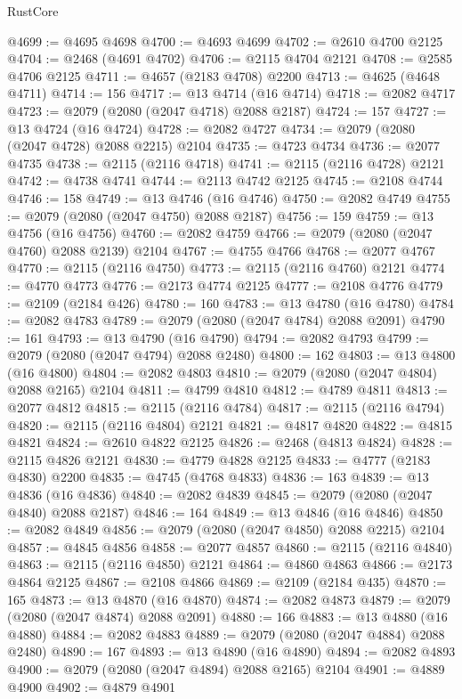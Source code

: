\begin{lexlean}{RustCore}
\begin{coremodule}
@4699 := @4695 @4698
@4700 := @4693 @4699
@4702 := @2610 @4700 @2125
@4704 := @2468 (@4691 @4702)
@4706 := @2115 @4704 @2121
@4708 := @2585 @4706 @2125
@4711 := @4657 (@2183 @4708) @2200
@4713 := @4625 (@4648 @4711)
@4714 := 156
@4717 := @13 @4714 (@16 @4714)
@4718 := @2082 @4717
@4723 := @2079 (@2080 (@2047 @4718) @2088 @2187)
@4724 := 157
@4727 := @13 @4724 (@16 @4724)
@4728 := @2082 @4727
@4734 := @2079 (@2080 (@2047 @4728) @2088 @2215) @2104
@4735 := @4723 @4734
@4736 := @2077 @4735
@4738 := @2115 (@2116 @4718)
@4741 := @2115 (@2116 @4728) @2121
@4742 := @4738 @4741
@4744 := @2113 @4742 @2125
@4745 := @2108 @4744
@4746 := 158
@4749 := @13 @4746 (@16 @4746)
@4750 := @2082 @4749
@4755 := @2079 (@2080 (@2047 @4750) @2088 @2187)
@4756 := 159
@4759 := @13 @4756 (@16 @4756)
@4760 := @2082 @4759
@4766 := @2079 (@2080 (@2047 @4760) @2088 @2139) @2104
@4767 := @4755 @4766
@4768 := @2077 @4767
@4770 := @2115 (@2116 @4750)
@4773 := @2115 (@2116 @4760) @2121
@4774 := @4770 @4773
@4776 := @2173 @4774 @2125
@4777 := @2108 @4776
@4779 := @2109 (@2184 @426)
@4780 := 160
@4783 := @13 @4780 (@16 @4780)
@4784 := @2082 @4783
@4789 := @2079 (@2080 (@2047 @4784) @2088 @2091)
@4790 := 161
@4793 := @13 @4790 (@16 @4790)
@4794 := @2082 @4793
@4799 := @2079 (@2080 (@2047 @4794) @2088 @2480)
@4800 := 162
@4803 := @13 @4800 (@16 @4800)
@4804 := @2082 @4803
@4810 := @2079 (@2080 (@2047 @4804) @2088 @2165) @2104
@4811 := @4799 @4810
@4812 := @4789 @4811
@4813 := @2077 @4812
@4815 := @2115 (@2116 @4784)
@4817 := @2115 (@2116 @4794)
@4820 := @2115 (@2116 @4804) @2121
@4821 := @4817 @4820
@4822 := @4815 @4821
@4824 := @2610 @4822 @2125
@4826 := @2468 (@4813 @4824)
@4828 := @2115 @4826 @2121
@4830 := @4779 @4828 @2125
@4833 := @4777 (@2183 @4830) @2200
@4835 := @4745 (@4768 @4833)
@4836 := 163
@4839 := @13 @4836 (@16 @4836)
@4840 := @2082 @4839
@4845 := @2079 (@2080 (@2047 @4840) @2088 @2187)
@4846 := 164
@4849 := @13 @4846 (@16 @4846)
@4850 := @2082 @4849
@4856 := @2079 (@2080 (@2047 @4850) @2088 @2215) @2104
@4857 := @4845 @4856
@4858 := @2077 @4857
@4860 := @2115 (@2116 @4840)
@4863 := @2115 (@2116 @4850) @2121
@4864 := @4860 @4863
@4866 := @2173 @4864 @2125
@4867 := @2108 @4866
@4869 := @2109 (@2184 @435)
@4870 := 165
@4873 := @13 @4870 (@16 @4870)
@4874 := @2082 @4873
@4879 := @2079 (@2080 (@2047 @4874) @2088 @2091)
@4880 := 166
@4883 := @13 @4880 (@16 @4880)
@4884 := @2082 @4883
@4889 := @2079 (@2080 (@2047 @4884) @2088 @2480)
@4890 := 167
@4893 := @13 @4890 (@16 @4890)
@4894 := @2082 @4893
@4900 := @2079 (@2080 (@2047 @4894) @2088 @2165) @2104
@4901 := @4889 @4900
@4902 := @4879 @4901

\end{coremodule}
\end{lexlean}
